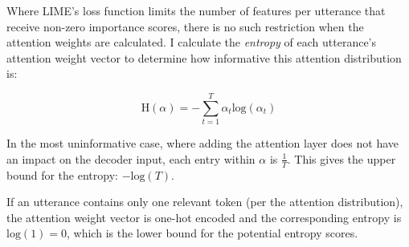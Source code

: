 Where LIME's loss function limits the number of features per utterance that receive non-zero importance scores, there is no such restriction when the attention weights are calculated.
I calculate the \textit{entropy} of each utterance's attention weight vector to determine how informative this attention distribution is:

\begin{equation}
    \text{H}(\alpha{}) = - \sum_{t=1}^T \alpha_t \text{log}(\alpha_t)
\end{equation}

In the most uninformative case, where adding the attention layer does not have an impact on the decoder input, each entry within $\alpha$ is $\frac{1}{T}$. 
This gives the upper bound for the entropy: $-\text{log}(T)$.

If an utterance contains only one relevant token (per the attention distribution), the attention weight vector is one-hot encoded and the corresponding entropy is $\text{log}(1) = 0$, which is the lower bound for the potential entropy scores.